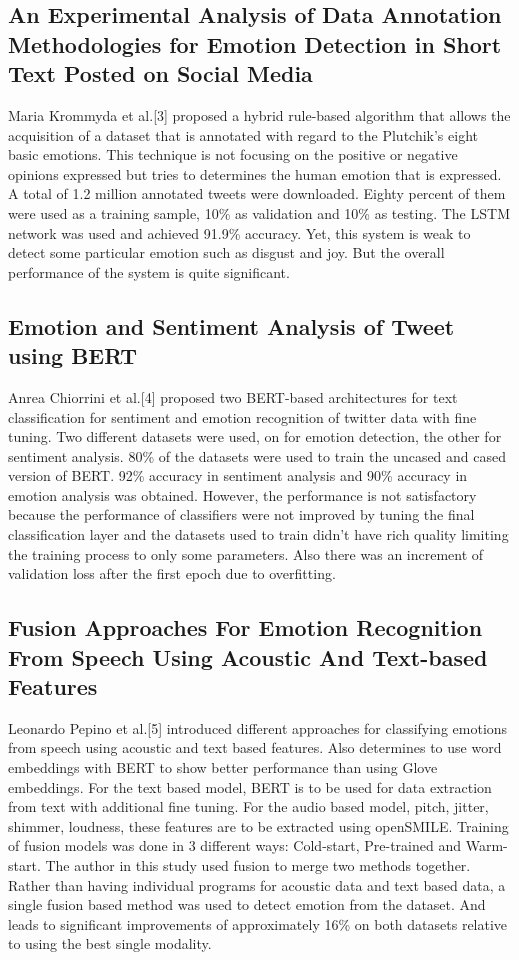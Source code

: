 \subsection{An Experimental Analysis of Data Annotation Methodologies for Emotion Detection in Short Text Posted on Social Media}

Maria Krommyda et al.[3] proposed a hybrid rule-based algorithm that allows the acquisition of a dataset that is annotated with regard to the Plutchik's eight basic emotions. This technique is not focusing on the positive or negative opinions expressed but tries to determines the human emotion that is expressed. A total of 1.2 million annotated tweets were downloaded. Eighty percent of them were used as a training sample, 10\% as validation and 10\% as testing. The LSTM network was used and achieved 91.9\% accuracy. Yet, this system is weak to detect some particular emotion such as disgust and joy. But the overall performance of the system is quite significant. 

\subsection{Emotion and Sentiment Analysis of Tweet using BERT}

Anrea Chiorrini et al.[4] proposed two BERT-based architectures for text classification for sentiment and emotion recognition of twitter data with fine tuning. Two different datasets were used, on for emotion detection, the other for sentiment analysis. 80\% of the datasets were used to train the uncased and cased version of BERT. 92\% accuracy in sentiment analysis and 90\% accuracy in emotion analysis was obtained. However, the performance is not satisfactory because the performance of classifiers were not improved by tuning the final classification layer and the datasets used to train didn’t have rich quality limiting the training process to only some parameters. Also there was an increment of validation loss after the first epoch due to overfitting.

\subsection{Fusion Approaches For Emotion Recognition From Speech Using Acoustic And Text-based Features}
Leonardo Pepino et al.[5] introduced different approaches for classifying emotions from speech using acoustic and text based features. Also determines to use word embeddings with BERT to show better performance than using Glove embeddings. For the text based model, BERT is to be used for data extraction from text with additional fine tuning. For the audio based model, pitch, jitter, shimmer, loudness, these features are to be extracted using openSMILE. Training of fusion models was done in 3 different ways: Cold-start, Pre-trained and Warm-start. The author in this study used fusion to merge two methods together. Rather than having individual programs for acoustic data and text based data, a single fusion based method was used to detect emotion from the dataset. And leads to significant improvements of approximately 16\% on both datasets relative to using the best single modality.

